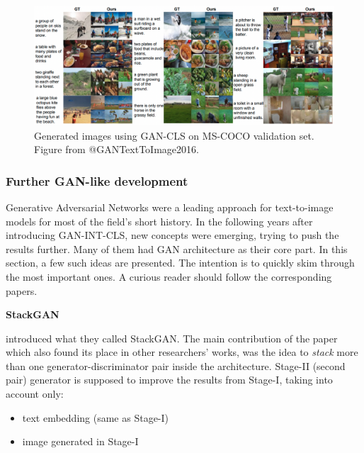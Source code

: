 \documentclass[
]{krantz}
\providecommand{\tightlist}{%
  \setlength{\itemsep}{0pt}\setlength{\parskip}{0pt}}
\begin{document}
\begin{figure}

{\centering \includegraphics[width=1\linewidth]{figures/02-02-text-2-img/ganclsmscoco} 

}

\caption{Generated images using GAN-CLS on MS-COCO validation set. Figure from @GANTextToImage2016.}\label{fig:ganclsmscoco}
\end{figure}

\hypertarget{further-gan-like-development}{%
\subsubsection{Further GAN-like development}\label{further-gan-like-development}}

Generative Adversarial Networks were a leading approach for text-to-image models for most of the field's short history. In the following years after introducing GAN-INT-CLS, new concepts were emerging, trying to push the results further. Many of them had GAN architecture as their core part. In this section, a few such ideas are presented. The intention is to quickly skim through the most important ones. A curious reader should follow the corresponding papers.

\textbf{StackGAN}

\citet{StackGAN2016} introduced what they called StackGAN. The main contribution of the paper which also found its place in other researchers' works, was the idea to \emph{stack} more than one generator-discriminator pair inside the architecture. Stage-II (second pair) generator is supposed to improve the results from Stage-I, taking into account only:

\begin{itemize}
\tightlist
\item
  text embedding (same as Stage-I)
\item
  image generated in Stage-I
\end{itemize}
\end{document}
